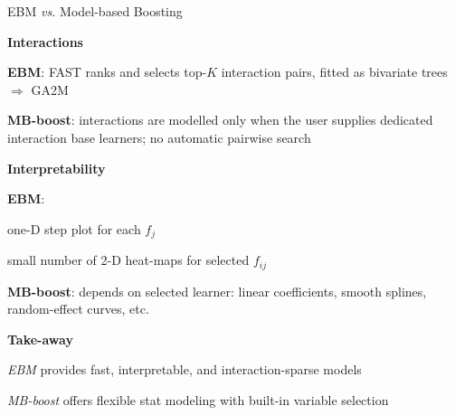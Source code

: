 \documentclass[10pt,compress,t,notes=noshow, xcolor=table]{beamer}
\begin{document}
\begin{framei}[align=top]{EBM \textit{vs.} Model-based Boosting}
\item \textbf{Interactions}
\begin{itemizeS}
\item \textbf{EBM}: FAST ranks and selects top-$K$ interaction pairs, fitted as bivariate trees $\Rightarrow$ GA2M
\item \textbf{MB-boost}: interactions are modelled only when the user supplies dedicated interaction base learners; no automatic pairwise search
\end{itemizeS}
\pause
\item \textbf{Interpretability}
\begin{itemizeS}
\item \textbf{EBM}:
\begin{itemizeS}
\item one-D step plot for each $f_{j}$
\item small number of 2-D heat-maps for selected $f_{ij}$
\end{itemizeS}
\item \textbf{MB-boost}: depends on selected learner: linear coefficients, smooth splines, random-effect curves, etc. %
\end{itemizeS}
\pause
\item \textbf{Take-away}
\begin{itemizeS}
\item \emph{EBM} provides fast, interpretable, and interaction-sparse models
\item \emph{MB-boost} offers flexible stat modeling with built-in variable selection %
\end{itemizeS}
\end{framei}


\endlecture
\end{document}

